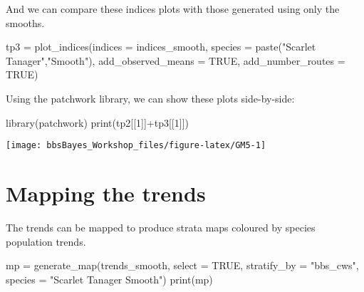 \documentclass[
]{book}
\newenvironment{Shaded}{\begin{snugshade}}{\end{snugshade}}
\newcommand{\AttributeTok}[1]{\textcolor[rgb]{0.77,0.63,0.00}{#1}}
\newcommand{\ConstantTok}[1]{\textcolor[rgb]{0.00,0.00,0.00}{#1}}
\newcommand{\DecValTok}[1]{\textcolor[rgb]{0.00,0.00,0.81}{#1}}
\newcommand{\FunctionTok}[1]{\textcolor[rgb]{0.00,0.00,0.00}{#1}}
\newcommand{\NormalTok}[1]{#1}
\newcommand{\OtherTok}[1]{\textcolor[rgb]{0.56,0.35,0.01}{#1}}
\newcommand{\SpecialCharTok}[1]{\textcolor[rgb]{0.00,0.00,0.00}{#1}}
\newcommand{\StringTok}[1]{\textcolor[rgb]{0.31,0.60,0.02}{#1}}
\begin{document}
And we can compare these indices plots with those generated using only the smooths.

\begin{Shaded}
\begin{Highlighting}[]
\NormalTok{tp3 }\OtherTok{=} \FunctionTok{plot\_indices}\NormalTok{(}\AttributeTok{indices =}\NormalTok{ indices\_smooth,}
                         \AttributeTok{species =} \FunctionTok{paste}\NormalTok{(}\StringTok{"Scarlet Tanager"}\NormalTok{,}\StringTok{"Smooth"}\NormalTok{),}
                  \AttributeTok{add\_observed\_means =} \ConstantTok{TRUE}\NormalTok{,}
                  \AttributeTok{add\_number\_routes =} \ConstantTok{TRUE}\NormalTok{)}
\end{Highlighting}
\end{Shaded}

Using the patchwork library, we can show these plots side-by-side:

\begin{Shaded}
\begin{Highlighting}[]
\FunctionTok{library}\NormalTok{(patchwork)}
\FunctionTok{print}\NormalTok{(tp2[[}\DecValTok{1}\NormalTok{]]}\SpecialCharTok{+}\NormalTok{tp3[[}\DecValTok{1}\NormalTok{]])}
\end{Highlighting}
\end{Shaded}

\begin{center}\texttt{[image: bbsBayes\_Workshop\_files/figure-latex/GM5-1]} \end{center}

\hypertarget{mapping-the-trends}{%
\section{Mapping the trends}\label{mapping-the-trends}}

The trends can be mapped to produce strata maps coloured by species population trends.

\begin{Shaded}
\begin{Highlighting}[]
\NormalTok{mp }\OtherTok{=} \FunctionTok{generate\_map}\NormalTok{(trends\_smooth,}
                  \AttributeTok{select =} \ConstantTok{TRUE}\NormalTok{,}
                  \AttributeTok{stratify\_by =} \StringTok{"bbs\_cws"}\NormalTok{,}
                  \AttributeTok{species =} \StringTok{"Scarlet Tanager Smooth"}\NormalTok{)}
\FunctionTok{print}\NormalTok{(mp)}
\end{Highlighting}
\end{Shaded}
\end{document}
